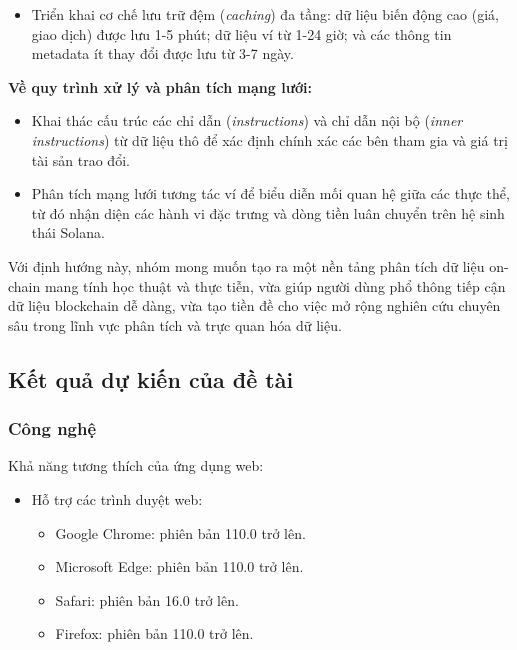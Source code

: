 \documentclass{article}[14pt]
\begin{document}
{\begin{itemize}
\item Triển khai cơ chế lưu trữ đệm ({\it caching}) đa tầng: dữ liệu biến động cao (giá, giao dịch) được lưu 1-5 phút; dữ liệu ví từ 1-24 giờ; và các thông tin metadata ít thay đổi được lưu từ 3-7 ngày.
    \end{itemize}
\textbf {Về quy trình xử lý và phân tích mạng lưới:}
    \begin{itemize}
    \item Khai thác cấu trúc các chỉ dẫn ({\it instructions}) và chỉ dẫn nội bộ ({\it inner instructions}) từ dữ liệu thô để xác định chính xác các bên tham gia và giá trị tài sản trao đổi.


\item Phân tích mạng lưới tương tác ví để biểu diễn mối quan hệ giữa các thực thể, từ đó nhận diện các hành vi đặc trưng và dòng tiền luân chuyển trên hệ sinh thái Solana.
    \end{itemize}
    
    Với định hướng này, nhóm mong muốn tạo ra một nền tảng phân tích dữ liệu on-chain mang tính học thuật và thực tiễn, vừa giúp người dùng phổ thông tiếp cận dữ liệu blockchain dễ dàng, vừa tạo tiền đề cho việc mở rộng nghiên cứu chuyên sâu trong lĩnh vực phân tích và trực quan hóa dữ liệu.

    \subsection{Kết quả dự kiến của đề tài}
    \subsubsection{Công nghệ}
    Khả năng tương thích của ứng dụng web:
    \begin{itemize}
        \item Hỗ trợ các trình duyệt web:
        \begin{itemize}
            \item Google Chrome: phiên bản 110.0 trở lên.
            \item Microsoft Edge: phiên bản 110.0 trở lên.
            \item Safari: phiên bản 16.0 trở lên.
            \item Firefox: phiên bản 110.0 trở lên.
        \end{itemize}
    

\end{itemize}}
\end{document}
